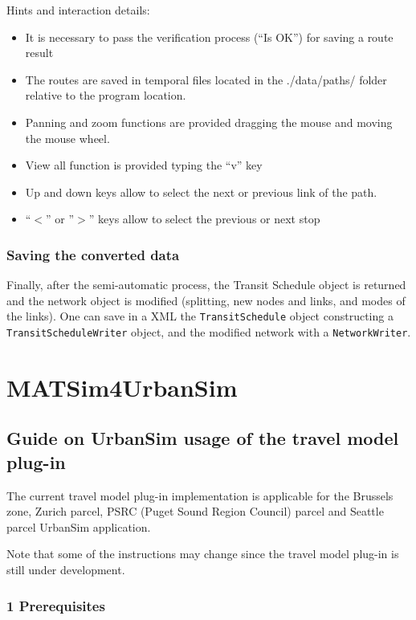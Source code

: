 \documentclass[a4paper,11pt]{report}
\begin{document}
Hints and interaction details:
\begin{itemize}
	\item It is necessary to pass the verification process (“Is OK”) for saving a route result
	\item The routes are saved in temporal files located in the ./data/paths/ folder relative to the program location.
	\item Panning and zoom functions are provided dragging the mouse and moving the mouse wheel.
	\item View all function is provided typing the “v” key
	\item Up and down keys allow to select the next or previous link of the path.
	\item “$<$” or ”$>$” keys allow to select the previous or next stop 


\end{itemize}

\subsubsection{Saving the converted data}

Finally, after the semi-automatic process, the Transit Schedule  object is returned and the network object is modified (splitting, new  nodes and links, and modes of the links). One can save in a XML  the 
\texttt{TransitSchedule} object constructing a 
\texttt{TransitScheduleWriter} object, and the modified network with a 
\texttt{NetworkWriter}.

\vfill\eject
\section{MATSim4UrbanSim}

\subsection{Guide on UrbanSim usage of the travel model plug-in}

The current travel model plug-in implementation is applicable for the  Brussels zone, Zurich parcel, PSRC (Puget Sound Region Council) parcel  and Seattle parcel UrbanSim application.

Note that some of the instructions may change since the travel model plug-in is still under development.

\subsubsection{1 Prerequisites}
\end{document}
